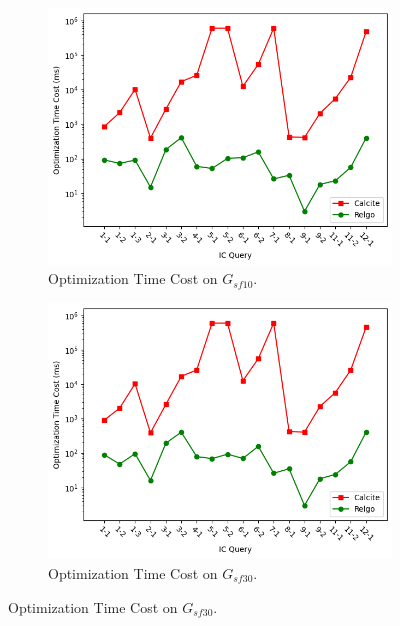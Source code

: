 \begin{figure}
    \centering
    \begin{subfigure}[b]{0.3\linewidth}
        \centering
        \includegraphics[width=\linewidth]{./figures/exp/optimization_sf10.png}
        \caption{Optimization Time Cost on $G_{sf10}$.}
        \label{fig:exp-optimization-sf10}
    \end{subfigure}
    \begin{subfigure}[b]{0.3\linewidth}
        \centering
        \includegraphics[width=\linewidth]{./figures/exp/optimization_sf30.png}
        \caption{Optimization Time Cost on $G_{sf30}$.}
        \label{fig:exp-optimization-sf30}
    \end{subfigure}

\end{figure}
